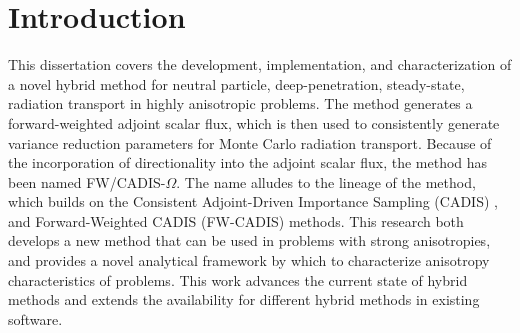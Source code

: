\chapter{Introduction}
\label{ch:introduction}

This dissertation covers the development,
implementation, and characterization
of a novel hybrid method for neutral particle, deep-penetration, steady-state,
radiation transport in
highly anisotropic problems. The method generates a forward-weighted adjoint
scalar flux, which is then used to consistently generate variance reduction
parameters for Monte Carlo radiation transport. Because of the incorporation
of directionality into the adjoint scalar flux,
the method has been named FW/CADIS-$\Omega$. The name alludes to the lineage of
the method, which builds on
the Consistent Adjoint-Driven Importance Sampling (CADIS)
\cite{wagner_automatic_1997, wagner_automated_1998, wagner_automated_2002,
haghighat_monte_2003},
and Forward-Weighted CADIS (FW-CADIS)
\cite{wagner_forward-weighted_2007,
wagner_forward-weighted_2009} methods.
This research both develops a new method that can be used in problems with
strong anisotropies, and provides a novel
analytical framework by which to characterize anisotropy characteristics of
problems. This
work advances the current state of hybrid methods and extends the availability
for different hybrid methods in existing software.




% 




